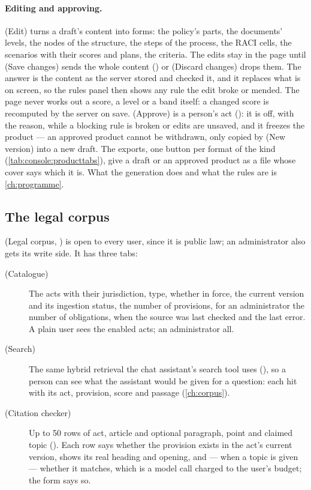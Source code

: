 \paragraph{Editing and approving.}  (Edit) turns a draft's content into forms:
the policy's parts, the documents' levels, the nodes of the structure, the steps of the process,
the RACI cells, the scenarios with their scores and plans, the criteria. The edits stay in the
page until  (Save changes) sends the whole content
() or  (Discard changes) drops
them. The answer is the content as the server stored and checked it, and it replaces what is on
screen, so the rules panel then shows any rule the edit broke or mended. The page never works out
a score, a level or a band itself: a changed score is recomputed by the server on save.  (Approve) is a person's act
(): it is off, with the reason, while a blocking rule is broken or
edits are unsaved, and it freezes the product --- an approved product cannot be withdrawn, only
copied by  (New version) into a new draft. The exports, one button per format
of the kind (\cref{tab:console:producttabs}), give a draft or an approved product as a file whose
cover says which it is. What the generation does and what the rules are is
\cref{ch:programme}.

\subsection{The legal corpus}\label{sec:console:corpus}

 (Legal corpus, ) is open to every user,
since it is public law; an administrator also gets its write side. It has three tabs:

\begin{description}
  \item[ (Catalogue)] The acts with their jurisdiction, type, whether in force,
    the current version and its ingestion status, the number of provisions, for an
    administrator the number of obligations, when the source was last checked and the last
    error. A plain user sees the enabled acts; an administrator all.
  \item[ (Search)] The same hybrid retrieval the chat assistant's search tool uses
    (), so a person can see what the assistant would be given
    for a
    question: each hit with its act, provision, score and passage (\cref{ch:corpus}).
  \item[ (Citation checker)] Up to 50 rows of act, article and optional
    paragraph, point and claimed topic (). Each row
    says whether the provision exists in the act's current version, shows its real heading and
    opening, and --- when a topic is given --- whether it matches, which is a model call
    charged to the user's budget; the form says so.
\end{description}

